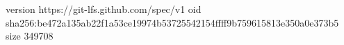 version https://git-lfs.github.com/spec/v1
oid sha256:be472a135ab22f1a53ce19974b53725542154ffff9b759615813e350a0e373b5
size 349708

